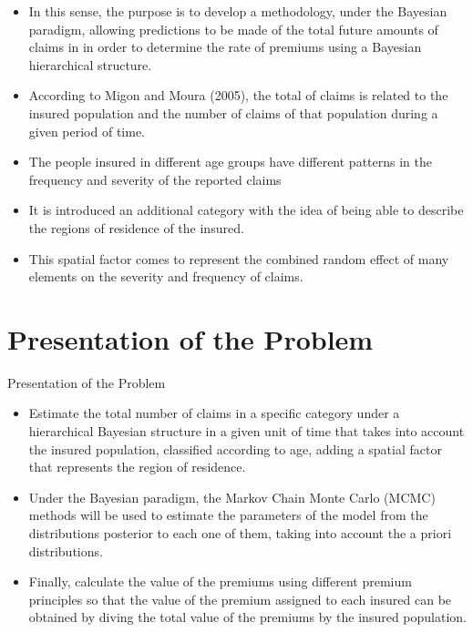 \documentclass[10pt]{beamer} %
\begin{document}
\begin{frame}
\begin{itemize}
    \item In this sense, the purpose is to develop a methodology, under the Bayesian paradigm, allowing predictions to be made of the total future amounts of claims in in order to determine the rate of premiums using a Bayesian hierarchical structure.
    \item According to Migon and Moura (2005), the total of claims is related to the insured population and the number of claims of that population during a given period of time.
    \item The people insured in different age groups have different patterns in the frequency and severity of the reported claims
    \item It is introduced an additional category with the idea of being able to describe the regions of residence of the insured. 
    \item This spatial factor comes to represent the combined random effect of many elements on the severity and frequency of claims. 
\end{itemize}
\end{frame}


\section{Presentation of the Problem}
\begin{frame}{Presentation of the Problem}
\begin{itemize}
    \item Estimate the total number of claims in a specific category under a hierarchical Bayesian structure in a given unit of time that takes into account the insured population, classified according to age, adding a spatial factor that represents the region of residence. 
    \item Under the Bayesian paradigm, the Markov Chain Monte Carlo (MCMC) methods will be used to estimate the parameters of the model from the distributions posterior to each one of them, taking into account the a priori distributions.
    \item Finally, calculate the value of the premiums using different premium principles so that the value of the premium assigned to each insured can be obtained by diving the total value of the premiums by the insured population.
\end{itemize}
\end{frame}
\end{document}
